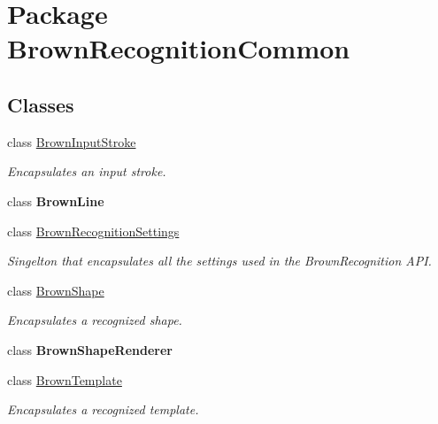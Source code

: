 \hypertarget{namespace_brown_recognition_common}{
\section{\-Package \-Brown\-Recognition\-Common}
\label{namespace_brown_recognition_common}
}
\subsection*{\-Classes}
\begin{DoxyCompactItemize}
\item 
class \hyperlink{class_brown_recognition_common_1_1_brown_input_stroke}{\-Brown\-Input\-Stroke}
\begin{DoxyCompactList}\small\item\em \-Encapsulates an input stroke. \end{DoxyCompactList}\item 
class {\bfseries \-Brown\-Line}
\item 
class \hyperlink{class_brown_recognition_common_1_1_brown_recognition_settings}{\-Brown\-Recognition\-Settings}
\begin{DoxyCompactList}\small\item\em \-Singelton that encapsulates all the settings used in the \-Brown\-Recognition \-A\-P\-I. \end{DoxyCompactList}\item 
class \hyperlink{class_brown_recognition_common_1_1_brown_shape}{\-Brown\-Shape}
\begin{DoxyCompactList}\small\item\em \-Encapsulates a recognized shape. \end{DoxyCompactList}\item 
class {\bfseries \-Brown\-Shape\-Renderer}
\item 
class \hyperlink{class_brown_recognition_common_1_1_brown_template}{\-Brown\-Template}
\begin{DoxyCompactList}\small\item\em \-Encapsulates a recognized template. \end{DoxyCompactList}\end{DoxyCompactItemize}
